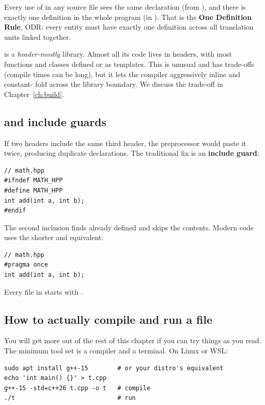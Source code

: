 Every use of  in any source file sees the same declaration
(from ), and there is exactly one definition in the
whole program (in ). That is the \textbf{One Definition
Rule}, ODR: every entity must have exactly one definition across all
translation units linked together.

\maya{} is a \emph{header-mostly} library. Almost all its code lives
in headers, with most functions and classes defined  or
as templates. This is unusual and has trade-offs (compile times can
be long), but it lets the compiler aggressively inline and constant-
fold across the library boundary. We discuss the trade-off in
Chapter~\ref{ch:build}.

\subsection{ and include guards}

If two headers include the same third header, the preprocessor would
paste it twice, producing duplicate declarations. The traditional
fix is an \textbf{include guard}:

\begin{lstlisting}
// math.hpp
#ifndef MATH_HPP
#define MATH_HPP
int add(int a, int b);
#endif
\end{lstlisting}

The second inclusion finds  already defined and skips
the contents. Modern code uses the shorter and equivalent:

\begin{lstlisting}
// math.hpp
#pragma once
int add(int a, int b);
\end{lstlisting}

Every file in \maya{} starts with .

\subsection{How to actually compile and run a \cpp{} file}

You will get more out of the rest of this chapter if you can try
things as you read. The minimum tool set is a compiler and a
terminal. On Linux or WSL:

\begin{lstlisting}[style=shell]
sudo apt install g++-15        # or your distro's equivalent
echo 'int main() {}' > t.cpp
g++-15 -std=c++26 t.cpp -o t   # compile
./t                            # run
\end{lstlisting}

